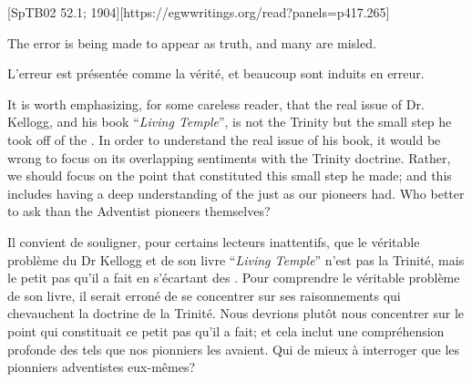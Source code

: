 [SpTB02 52.1; 1904][https://egwwritings.org/read?panels=p417.265]


The error is being made to appear as truth, and many are misled.


L'erreur est présentée comme la vérité, et beaucoup sont induits en erreur.


It is worth emphasizing, for some careless reader, that the real issue of Dr. Kellogg, and his book “\textit{Living Temple}”, is not the Trinity but the small step he took off of the . In order to understand the real issue of his book, it would be wrong to focus on its overlapping sentiments with the Trinity doctrine. Rather, we should focus on the point that constituted this small step he made; and this includes having a deep understanding of the  just as our pioneers had. Who better to ask than the Adventist pioneers themselves?


Il convient de souligner, pour certains lecteurs inattentifs, que le véritable problème du Dr Kellogg et de son livre “\textit{Living Temple}” n'est pas la Trinité, mais le petit pas qu'il a fait en s'écartant des . Pour comprendre le véritable problème de son livre, il serait erroné de se concentrer sur ses raisonnements qui chevauchent la doctrine de la Trinité. Nous devrions plutôt nous concentrer sur le point qui constituait ce petit pas qu'il a fait; et cela inclut une compréhension profonde des  tels que nos pionniers les avaient. Qui de mieux à interroger que les pionniers adventistes eux-mêmes?


